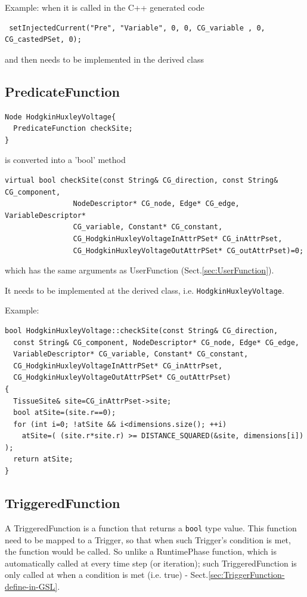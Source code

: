 Example: when it is called in the C++ generated code
\begin{verbatim}
 setInjectedCurrent("Pre", "Variable", 0, 0, CG_variable , 0, CG_castedPSet, 0);
\end{verbatim}
and then needs to be implemented in the derived class


\subsection{PredicateFunction}
\label{sec:PredicateFunction}

\begin{verbatim}
Node HodgkinHuxleyVoltage{
  PredicateFunction checkSite;
}
\end{verbatim}

is converted into a 'bool' method
\begin{verbatim}
virtual bool checkSite(const String& CG_direction, const String& CG_component, 
                NodeDescriptor* CG_node, Edge* CG_edge, VariableDescriptor*
                CG_variable, Constant* CG_constant,
                CG_HodgkinHuxleyVoltageInAttrPSet* CG_inAttrPset,
                CG_HodgkinHuxleyVoltageOutAttrPSet* CG_outAttrPset)=0;
\end{verbatim}
which has the same arguments as UserFunction (Sect.\ref{sec:UserFunction}).

It needs to be implemented at the derived class, i.e.
\verb!HodgkinHuxleyVoltage!.

Example:
\begin{verbatim}
bool HodgkinHuxleyVoltage::checkSite(const String& CG_direction, 
  const String& CG_component, NodeDescriptor* CG_node, Edge* CG_edge,
  VariableDescriptor* CG_variable, Constant* CG_constant,
  CG_HodgkinHuxleyVoltageInAttrPSet* CG_inAttrPset,
  CG_HodgkinHuxleyVoltageOutAttrPSet* CG_outAttrPset) 
{ 
  TissueSite& site=CG_inAttrPset->site; 
  bool atSite=(site.r==0); 
  for (int i=0; !atSite && i<dimensions.size(); ++i)
    atSite=( (site.r*site.r) >= DISTANCE_SQUARED(&site, dimensions[i]) );
  return atSite;
}
\end{verbatim}

\subsection{TriggeredFunction}
\label{sec:TriggeredFunction}

A TriggeredFunction is a function that returns a \verb!bool! type value.
This function need to be mapped to a Trigger, so that when such Trigger's
condition is met, the function would be called. So unlike a RuntimePhase
function, which is automatically called at every time step (or iteration); such
TriggeredFunction is only called at when a condition is met (i.e. true) -
Sect.\ref{sec:TriggerFunction-define-in-GSL}.

